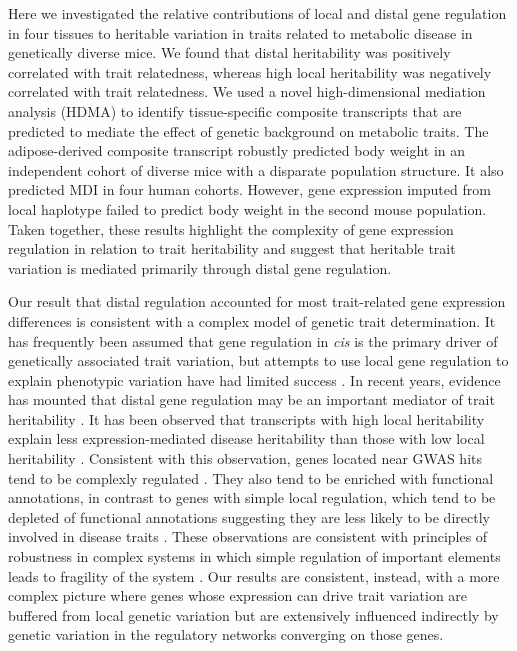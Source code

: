 \documentclass[
]{article}
\begin{document}
Here we investigated the relative contributions of local and distal gene
regulation in four tissues to heritable variation in traits related to
metabolic disease in genetically diverse mice. We found that distal
heritability was positively correlated with trait relatedness, whereas
high local heritability was negatively correlated with trait
relatedness. We used a novel high-dimensional mediation analysis (HDMA)
to identify tissue-specific composite transcripts that are predicted to
mediate the effect of genetic background on metabolic traits. The
adipose-derived composite transcript robustly predicted body weight in
an independent cohort of diverse mice with a disparate population
structure. It also predicted MDI in four human cohorts. However, gene
expression imputed from local haplotype failed to predict body weight in
the second mouse population. Taken together, these results highlight the
complexity of gene expression regulation in relation to trait
heritability and suggest that heritable trait variation is mediated
primarily through distal gene regulation.

Our result that distal regulation accounted for most trait-related gene
expression differences is consistent with a complex model of genetic
trait determination. It has frequently been assumed that gene regulation
in \textit{cis} is the primary driver of genetically associated trait
variation, but attempts to use local gene regulation to explain
phenotypic variation have had limited success
\cite{pmid32912663, pmid36515579}. In recent years, evidence has mounted
that distal gene regulation may be an important mediator of trait
heritability \cite{pmid32424349, 
pmid37857933, pmid31051098, pmid34475573}. It has been observed that
transcripts with high local heritability explain less
expression-mediated disease heritability than those with low local
heritability \cite{pmid32424349}. Consistent with this observation,
genes located near GWAS hits tend to be complexly regulated
\cite{pmid37857933}. They also tend to be enriched with functional
annotations, in contrast to genes with simple local regulation, which
tend to be depleted of functional annotations suggesting they are less
likely to be directly involved in disease traits \cite{pmid37857933}.
These observations are consistent with principles of robustness in
complex systems in which simple regulation of important elements leads
to fragility of the system
\cite{pmid29782925, pmid12082173, pmid27304973}. Our results are
consistent, instead, with a more complex picture where genes whose
expression can drive trait variation are buffered from local genetic
variation but are extensively influenced indirectly by genetic variation
in the regulatory networks converging on those genes.
\end{document}
